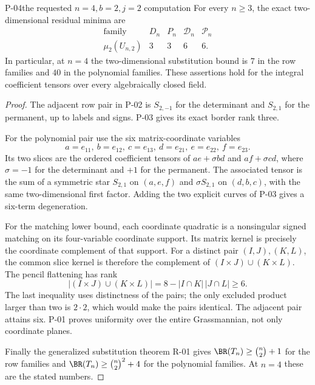 \begin{finding}{P-04}{the requested \(n=4,b=2,j=2\) computation}
For every \(n\geq3\), the exact two-dimensional residual minima are
\[
 \begin{array}{c|cccc}
 \text{family}&D_n&P_n&\mathcal D_n&\mathcal P_n\\ \hline
 \mu_2(U_{n,2})&3&3&6&6 .
 \end{array}
\]
In particular, at \(n=4\) the two-dimensional substitution
bound is \(7\) in the row families and \(40\) in the polynomial
families. These assertions hold for the integral coefficient
tensors over every algebraically closed field.
\end{finding}
\begin{proof}
The adjacent row pair in P-02 is \(S_{2,-1}\) for the
determinant and \(S_{2,1}\) for the permanent, up to labels and
signs. P-03 gives its exact border rank three.

For the polynomial pair use the six matrix-coordinate variables
\[
 a=e_{11},\ b=e_{12},\ c=e_{13},\
 d=e_{21},\ e=e_{22},\ f=e_{23}.
\]
Its two slices are the ordered coefficient tensors of
\(ae+\sigma bd\) and \(af+\sigma cd\), where \(\sigma=-1\)
for the determinant and \(+1\) for the permanent.
The associated tensor is the sum of a symmetric star
\(S_{2,1}\) on \((a,e,f)\) and \(\sigma S_{2,1}\) on
\((d,b,c)\), with the same two-dimensional first factor.
Adding the two explicit curves of P-03 gives a six-term
degeneration.

For the matching lower bound, each coordinate quadratic is a
nonsingular signed matching on its four-variable coordinate
support. Its matrix kernel is precisely the coordinate
complement of that support. For a distinct pair
\((I,J),(K,L)\), the common slice kernel is therefore the
complement of
\((I\times J)\cup(K\times L)\). The pencil flattening has rank
\[
 |(I\times J)\cup(K\times L)|
   =8-|I\cap K|\,|J\cap L|\geq6.
\]
The last inequality uses distinctness of the pairs; the only
excluded product larger than two is \(2\cdot2\), which would
make the pairs identical. The adjacent pair attains six.
P-01 proves uniformity over the entire Grassmannian, not only
coordinate planes.

Finally the generalized substitution theorem R-01 gives
\(\BR(T_n)\geq\binom n2+1\) for the row families and
\(\BR(T_n)\geq\binom n2^2+4\) for the polynomial families.
At \(n=4\) these are the stated numbers.
\end{proof}

